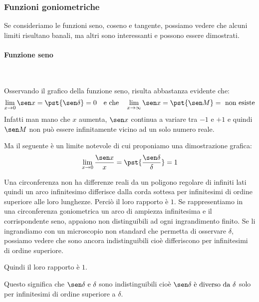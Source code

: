 \subsubsection{Funzioni goniometriche}

Se consideriamo le funzioni seno, coseno e tangente, possiamo vedere che 
alcuni limiti risultano banali, ma altri sono interessanti e possono essere 
dimostrati.

\begin{minipage}{.66\textwidth}
\begin{center} \sinusoide \end{center}
\begin{center} \cosinusoide \end{center}
\end{minipage}
\hfill
\begin{minipage}{.33\textwidth}
\begin{center} \tangentoide \end{center}
\end{minipage}

\paragraph{Funzione seno}~

Osservando il grafico della funzione seno, risulta abbastanza evidente che:
\[\lim_{x \rightarrow 0}{\sen x} = \pst{\sen \delta} = 0
\quad \text{e che} \quad 
\lim_{x \rightarrow \infty}{\sen x} = \pst{\sen M} = \text{ non esiste}\]
Infatti man mano che \(x\) aumenta, \(\sen x\)
continua a variare tra \(-1\) e \(+1\) e quindi 
\(\sen M\) non può essere infinitamente vicino ad un solo numero reale.

Ma il seguente è un limite notevole di cui proponiamo una dimostrazione 
grafica:
\[\lim_{x \rightarrow 0}\frac{\sen x}{x} = 
  \pst{\frac{\sen \delta}{\delta}} = 1\]
\begin{minipage}{.49\textwidth}
Una circonferenza non ha differenze reali da un poligono regolare di 
infiniti lati quindi un arco infinitesimo differisce dalla corda 
sottesa per infinitesimi di ordine superiore alle loro lunghezze. Perciò il 
loro rapporto è \(1\).
Se rappresentiamo in una circonferenza goniometrica un arco di ampiezza 
infinitesima e il corrispondente seno, appaiono non distinguibili ad ogni 
ingrandimento finito. 
Se li ingrandiamo con un microscopio non standard che permetta di 
osservare \(\delta\), possiamo vedere che sono ancora indistinguibili 
cioè differiscono per infinitesimi di ordine superiore. 

Quindi il loro rapporto è \(1\).
\end{minipage}
\hfill
\begin{minipage}{.49\textwidth}
\begin{center} \limiteseno \end{center}
\end{minipage}
Questo significa che \(\sen \delta \text{ e } \delta\) sono indistinguibili 
cioè \(\sen \delta \text{ è diverso da } \delta\) solo per infinitesimi di 
ordine superiore a \(\delta\).

